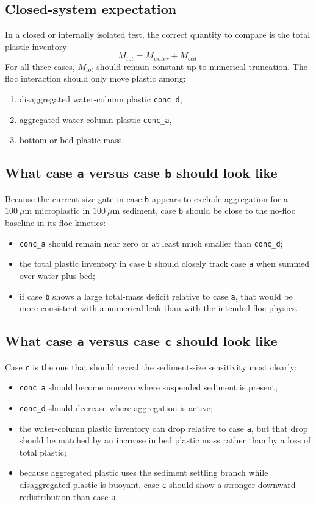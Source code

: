 \documentclass[11pt]{article}
\begin{document}
\subsection{Closed-system expectation}
In a closed or internally isolated test, the correct quantity to compare is the total plastic inventory
\[
M_{tot} = M_{water} + M_{bed}.
\]
For all three cases, \(M_{tot}\) should remain constant up to numerical truncation. The floc interaction
should only move plastic among:
\begin{enumerate}
\item disaggregated water-column plastic \texttt{conc\_d},
\item aggregated water-column plastic \texttt{conc\_a},
\item bottom or bed plastic mass.
\end{enumerate}

\subsection{What case \texttt{a} versus case \texttt{b} should look like}
Because the current size gate in case \texttt{b} appears to exclude aggregation for a
\(100\ \mu\mathrm{m}\) microplastic in \(100\ \mu\mathrm{m}\) sediment, case \texttt{b} should be close to
the no-floc baseline in its floc kinetics:
\begin{itemize}
\item \texttt{conc\_a} should remain near zero or at least much smaller than \texttt{conc\_d};
\item the total plastic inventory in case \texttt{b} should closely track case \texttt{a} when summed over
water plus bed;
\item if case \texttt{b} shows a large total-mass deficit relative to case \texttt{a}, that would be more
consistent with a numerical leak than with the intended floc physics.
\end{itemize}

\subsection{What case \texttt{a} versus case \texttt{c} should look like}
Case \texttt{c} is the one that should reveal the sediment-size sensitivity most clearly:
\begin{itemize}
\item \texttt{conc\_a} should become nonzero where suspended sediment is present;
\item \texttt{conc\_d} should decrease where aggregation is active;
\item the water-column plastic inventory can drop relative to case \texttt{a}, but that drop should be
matched by an increase in bed plastic mass rather than by a loss of total plastic;
\item because aggregated plastic uses the sediment settling branch while disaggregated plastic is buoyant,
case \texttt{c} should show a stronger downward redistribution than case \texttt{a}.
\end{itemize}
\end{document}
